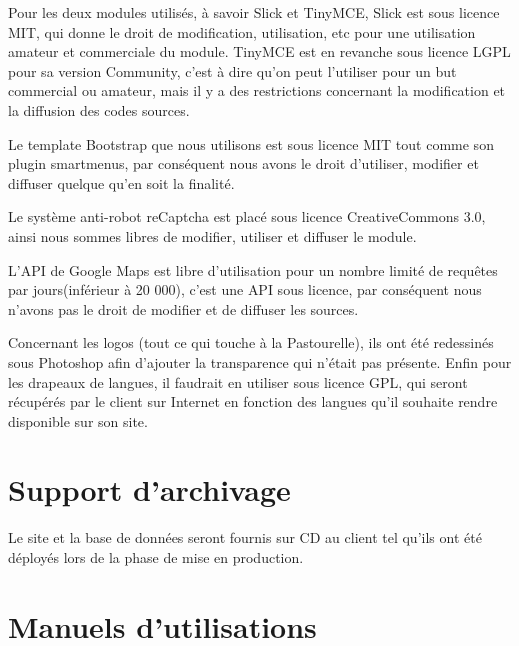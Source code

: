 \documentclass[11pt]{report}
\begin{document}
\par Pour les deux modules utilisés, à savoir Slick et TinyMCE, Slick est sous
licence MIT, qui donne le droit de modification, utilisation, etc pour une
utilisation amateur et commerciale du module. TinyMCE est en revanche sous
licence LGPL pour sa version Community, c'est à dire qu'on peut l'utiliser pour
un but commercial ou amateur, mais il y a des restrictions concernant la
modification et la diffusion des codes sources. \\

\par Le template Bootstrap que nous utilisons est sous licence MIT tout comme
son plugin smartmenus, par conséquent nous avons le droit d'utiliser, modifier
et diffuser quelque qu'en soit la finalité. \\

\par Le système anti-robot reCaptcha est placé sous licence CreativeCommons 3.0,
ainsi nous sommes libres de modifier, utiliser et diffuser le module. \\

\par L'API de Google Maps est libre d'utilisation pour un nombre limité de
requêtes par jours(inférieur à 20 000), c'est une API sous licence, par
conséquent nous n'avons pas le droit de modifier et de diffuser les sources.

\par Concernant les logos (tout ce qui touche à la Pastourelle), ils ont été
redessinés sous Photoshop afin d'ajouter la transparence qui n'était pas
présente. Enfin pour les drapeaux de langues, il faudrait en utiliser sous
licence GPL, qui seront récupérés par le client sur Internet en fonction des
langues qu'il souhaite rendre disponible sur son site.

\section{Support d'archivage}
Le site et la base de données seront fournis sur CD au client tel qu'ils
ont été déployés lors de la phase de mise en production.

\section{Manuels d'utilisations}
\end{document}
